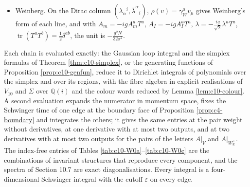 \begin{remark}
\begin{itemize}
\[
D_1:\ (A_{ij},A_{kl})\mapsto\Big[8A_{kl}A_{ij}-2\varepsilon_{ijkl}A^{mn}A_{mn}-8A_{ij}A_{kl}-\tfrac12\big(\tfrac13+\theta\big)\big(\big((2E+2)A_{ij}\big)A_{kl}+A_{ij}\big((2E+2)A_{kl}\big)\big)\Big]\ \text{units},
\]
so that on $\operatorname{tr}(A_{I_1}\cdots A_{I_L})$, $D_1=-8$ units times $\sum_l(1-\text{exchange}+\tfrac12\,\text{trace})_{l,l+1}$ minus $(\tfrac13+\theta)$ units times $2(E+L)$. For the Konishi operator $\tfrac14\int\omega\,(A^{ij},A_{ij})$ at the value $\theta=-\tfrac13$ of Theorem \ref{thm:c9-theta2}, $D_1=-48$ units times $O$, which is $\frac{3g^2N}{2\pi^2}O$ for $\mathfrak{su}(N)$, twice the Konishi anomalous dimension $\frac{3g^2N}{4\pi^2}$.
\item Weinberg. On the Dirac column $(\lambda_\alpha{}^i,\bar\lambda^{\dot\alpha}{}_i)$, $\rho(v)=\gamma_W^\mu v_\mu$ gives Weinberg's form of each line, and with $A_m=-igA^a_mT^a$, $A_I=-igA^a_IT^a$, $\lambda=-\tfrac{ig}{\sqrt2}\lambda^aT^a$, $\operatorname{tr}(T^aT^b)=\tfrac12\delta^{ab}$, the unit is $-\frac{g^2N}{32\pi^2}$.
\end{itemize}
\end{remark}

\begin{remark}
\label{rem:c10-method}
Each chain is evaluated exactly: the Gaussian loop integral and the simplex formulas of Theorem \ref{thm:c10-simplex}, or the generating functions of Proposition \ref{prop:c10-genfun}, reduce it to Dirichlet integrals of polynomials over the simplex and over its regions, with the fibre algebra in explicit realisations of $V_{10}$ and $\Sigma$ over $\mathbb Q(i)$ and the colour words reduced by Lemma \ref{lem:c10-colour}. A second evaluation expands the numerator in momentum space, fixes the Schwinger time of one edge at the boundary face of Proposition \ref{prop:c4-boundary} and integrates the others; it gives the same entries at the pair weight without derivatives, at one derivative with at most two outputs, and at two derivatives with at most two outputs for the pairs of the letters $A|_V$ and $A|_{W_{\mathbb R}^\perp}$. The index-free entries of Tables \ref{tab:c10-W0a}--\ref{tab:c10-W0c} are the combinations of invariant structures that reproduce every component, and the spectra of Section 10.7 are exact diagonalisations. Every integral is a four-dimensional Schwinger integral with the cutoff $\varepsilon$ on every edge.
\end{remark}

